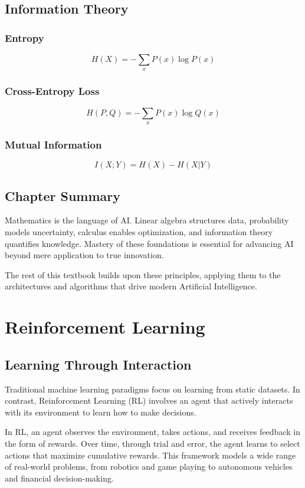 \documentclass[openany]{book}
\begin{document}
\section{Information Theory}

\subsection{Entropy}
\[
H(X) = -\sum_x P(x)\log P(x)
\]

\subsection{Cross-Entropy Loss}
\[
H(P,Q) = -\sum_x P(x)\log Q(x)
\]

\subsection{Mutual Information}
\[
I(X;Y) = H(X) - H(X|Y)
\]

\section{Chapter Summary}

Mathematics is the language of AI. Linear algebra structures data, probability 
models uncertainty, calculus enables optimization, and information theory 
quantifies knowledge. Mastery of these foundations is essential for advancing 
AI beyond mere application to true innovation.

The rest of this textbook builds upon these principles, applying them to the 
architectures and algorithms that drive modern Artificial Intelligence.

\chapter{Reinforcement Learning}

\section{Learning Through Interaction}

Traditional machine learning paradigms focus on learning from static datasets. 
In contrast, Reinforcement Learning (RL) involves an agent that actively 
interacts with its environment to learn how to make decisions.

In RL, an agent observes the environment, takes actions, and receives feedback 
in the form of rewards. Over time, through trial and error, the agent learns to 
select actions that maximize cumulative rewards. This framework models a wide 
range of real-world problems, from robotics and game playing to autonomous 
vehicles and financial decision-making.
\end{document}
